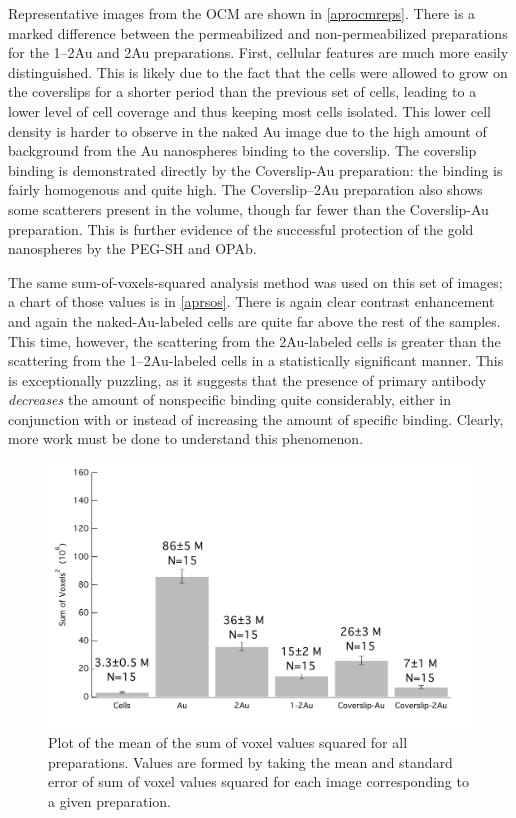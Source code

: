 Representative images from the OCM are shown in \autoref{aprocmreps}. There is a marked difference between the permeabilized and non-permeabilized preparations for the 1--2Au and 2Au preparations. First, cellular features are much more easily distinguished. This is likely due to the fact that the cells were allowed to grow on the coverslips for a shorter period than the previous set of cells, leading to a lower level of cell coverage and thus keeping most cells isolated. This lower cell density is harder to observe in the naked Au image due to the high amount of background from the Au nanospheres binding to the coverslip. The coverslip binding is demonstrated directly by the Coverslip-Au preparation: the binding is fairly homogenous and quite high. The Coverslip--2Au preparation also shows some scatterers present in the volume, though far fewer than the Coverslip-Au preparation. This is further evidence of the successful protection of the gold nanospheres by the PEG-SH and OPAb.

The same sum-of-voxels-squared analysis method was used on this set of images; a chart of those values is in \autoref{aprsos}. There is again clear contrast enhancement and again the naked-Au-labeled cells are quite far above the rest of the samples. This time, however, the scattering from the 2Au-labeled cells is greater than the scattering from the 1--2Au-labeled cells in a statistically significant manner. This is exceptionally puzzling, as it suggests that the presence of primary antibody \emph{decreases} the amount of nonspecific binding quite considerably, either in conjunction with or instead of increasing the amount of specific binding. Clearly, more work must be done to understand this phenomenon.

\begin{figure}[htbp]
\centering
\includegraphics[keepaspectratio,width=\textwidth,height=0.75\textheight]{3aprSOSgraph.pdf}
\caption{Plot of the mean of the sum of voxel values squared for all preparations. Values are formed by taking the mean and standard error of sum of voxel values squared for each image corresponding to a given preparation.}
\label{aprsos}
\end{figure}

